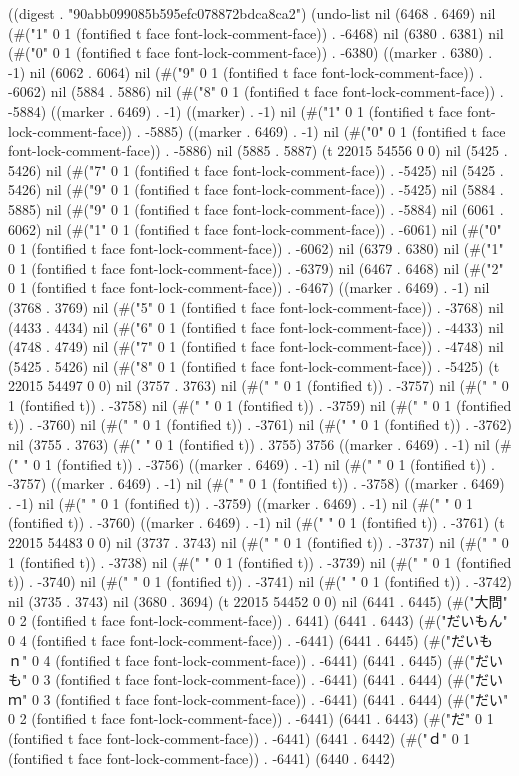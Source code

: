 
((digest . "90abb099085b595efc078872bdca8ca2") (undo-list nil (6468 . 6469) nil (#("1" 0 1 (fontified t face font-lock-comment-face)) . -6468) nil (6380 . 6381) nil (#("0" 0 1 (fontified t face font-lock-comment-face)) . -6380) ((marker . 6380) . -1) nil (6062 . 6064) nil (#("9" 0 1 (fontified t face font-lock-comment-face)) . -6062) nil (5884 . 5886) nil (#("8" 0 1 (fontified t face font-lock-comment-face)) . -5884) ((marker . 6469) . -1) ((marker) . -1) nil (#("1" 0 1 (fontified t face font-lock-comment-face)) . -5885) ((marker . 6469) . -1) nil (#("0" 0 1 (fontified t face font-lock-comment-face)) . -5886) nil (5885 . 5887) (t 22015 54556 0 0) nil (5425 . 5426) nil (#("7" 0 1 (fontified t face font-lock-comment-face)) . -5425) nil (5425 . 5426) nil (#("9" 0 1 (fontified t face font-lock-comment-face)) . -5425) nil (5884 . 5885) nil (#("9" 0 1 (fontified t face font-lock-comment-face)) . -5884) nil (6061 . 6062) nil (#("1" 0 1 (fontified t face font-lock-comment-face)) . -6061) nil (#("0" 0 1 (fontified t face font-lock-comment-face)) . -6062) nil (6379 . 6380) nil (#("1" 0 1 (fontified t face font-lock-comment-face)) . -6379) nil (6467 . 6468) nil (#("2" 0 1 (fontified t face font-lock-comment-face)) . -6467) ((marker . 6469) . -1) nil (3768 . 3769) nil (#("5" 0 1 (fontified t face font-lock-comment-face)) . -3768) nil (4433 . 4434) nil (#("6" 0 1 (fontified t face font-lock-comment-face)) . -4433) nil (4748 . 4749) nil (#("7" 0 1 (fontified t face font-lock-comment-face)) . -4748) nil (5425 . 5426) nil (#("8" 0 1 (fontified t face font-lock-comment-face)) . -5425) (t 22015 54497 0 0) nil (3757 . 3763) nil (#(" " 0 1 (fontified t)) . -3757) nil (#(" " 0 1 (fontified t)) . -3758) nil (#(" " 0 1 (fontified t)) . -3759) nil (#(" " 0 1 (fontified t)) . -3760) nil (#(" " 0 1 (fontified t)) . -3761) nil (#(" " 0 1 (fontified t)) . -3762) nil (3755 . 3763) (#(" " 0 1 (fontified t)) . 3755) 3756 ((marker . 6469) . -1) nil (#(" " 0 1 (fontified t)) . -3756) ((marker . 6469) . -1) nil (#(" " 0 1 (fontified t)) . -3757) ((marker . 6469) . -1) nil (#(" " 0 1 (fontified t)) . -3758) ((marker . 6469) . -1) nil (#(" " 0 1 (fontified t)) . -3759) ((marker . 6469) . -1) nil (#(" " 0 1 (fontified t)) . -3760) ((marker . 6469) . -1) nil (#(" " 0 1 (fontified t)) . -3761) (t 22015 54483 0 0) nil (3737 . 3743) nil (#(" " 0 1 (fontified t)) . -3737) nil (#(" " 0 1 (fontified t)) . -3738) nil (#(" " 0 1 (fontified t)) . -3739) nil (#(" " 0 1 (fontified t)) . -3740) nil (#(" " 0 1 (fontified t)) . -3741) nil (#(" " 0 1 (fontified t)) . -3742) nil (3735 . 3743) nil (3680 . 3694) (t 22015 54452 0 0) nil (6441 . 6445) (#("大問" 0 2 (fontified t face font-lock-comment-face)) . 6441) (6441 . 6443) (#("だいもん" 0 4 (fontified t face font-lock-comment-face)) . -6441) (6441 . 6445) (#("だいもｎ" 0 4 (fontified t face font-lock-comment-face)) . -6441) (6441 . 6445) (#("だいも" 0 3 (fontified t face font-lock-comment-face)) . -6441) (6441 . 6444) (#("だいｍ" 0 3 (fontified t face font-lock-comment-face)) . -6441) (6441 . 6444) (#("だい" 0 2 (fontified t face font-lock-comment-face)) . -6441) (6441 . 6443) (#("だ" 0 1 (fontified t face font-lock-comment-face)) . -6441) (6441 . 6442) (#("ｄ" 0 1 (fontified t face font-lock-comment-face)) . -6441) (6440 . 6442) 